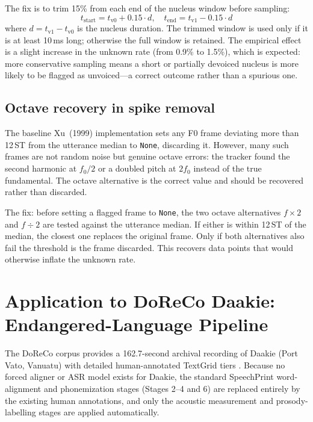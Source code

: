 The fix is to trim 15\% from each end of the nucleus window before sampling:
\begin{equation}
  t_{\mathrm{start}} = t_{\mathrm{v0}} + 0.15 \cdot d, \quad
  t_{\mathrm{end}}   = t_{\mathrm{v1}} - 0.15 \cdot d
\end{equation}
where $d = t_{\mathrm{v1}} - t_{\mathrm{v0}}$ is the nucleus duration. The
trimmed window is used only if it is at least 10\,ms long; otherwise the full
window is retained. The empirical effect is a slight increase in the unknown
rate (from 0.9\% to 1.5\%), which is expected: more conservative sampling means
a short or partially devoiced nucleus is more likely to be flagged as
unvoiced---a correct outcome rather than a spurious one.

\subsection{Octave recovery in spike removal}

The baseline Xu~(1999) implementation sets any F0 frame deviating more than
12\,ST from the utterance median to \texttt{None}, discarding it. However, many
such frames are not random noise but genuine octave errors: the tracker found
the second harmonic at $f_0 / 2$ or a doubled pitch at $2f_0$ instead of the
true fundamental. The octave alternative is the correct value and should be
recovered rather than discarded.

The fix: before setting a flagged frame to \texttt{None}, the two octave
alternatives $f \times 2$ and $f \div 2$ are tested against the utterance
median. If either is within 12\,ST of the median, the closest one replaces the
original frame. Only if both alternatives also fail the threshold is the frame
discarded. This recovers data points that would otherwise inflate the unknown
rate.

\section{Application to DoReCo Daakie: Endangered-Language Pipeline}
\label{sec:doreco_pipeline}

The DoReCo corpus provides a 162.7-second archival recording of Daakie (Port
Vato, Vanuatu) with detailed human-annotated TextGrid tiers
\cite{seifart2022doreco,krifka2024daakie}.
Because no forced aligner or ASR model exists for Daakie, the standard
SpeechPrint word-alignment and phonemization stages (Stages 2--4 and 6) are
replaced entirely by the existing human annotations, and only the acoustic
measurement and prosody-labelling stages are applied automatically.

